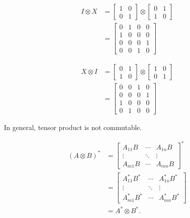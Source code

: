 \begin{align*}
	I \otimes X &= \begin{bmatrix}
		1 & 0 \\
		0 & 1
	\end{bmatrix}
	\otimes
	\begin{bmatrix}
		0 & 1 \\
		1 & 0
	\end{bmatrix}\\
	&=
	\begin{bmatrix}
	0 & 1 & 0 & 0 \\
	1 & 0 & 0 & 0 \\
	0 & 0 & 0 & 1 \\
	0 & 0 & 1 & 0
	\end{bmatrix}
\end{align*}

\begin{align*}
	X \otimes I &= \begin{bmatrix}
		0 & 1 \\
		1 & 0
	\end{bmatrix}
	\otimes
	\begin{bmatrix}
		1 & 0 \\
		0 & 1
	\end{bmatrix}\\
	&= \begin{bmatrix}
	0 & 0 & 1 & 0 \\
	0 & 0 & 0 & 1 \\
	1 & 0 & 0 & 0 \\
	0 & 1 & 0 & 0
	\end{bmatrix}
\end{align*}

In general, tensor product is not commutable.



\begin{align*}
	(A \otimes B)^*
	&=
	\begin{bmatrix}
		A_{11} B & \cdots & A_{1n} B \\
		\vdots & \ddots  & \vdots \\
		A_{m1}B & \cdots & A_{mn} B
	\end{bmatrix}^* \\
	&=
	\begin{bmatrix}
		A_{11}^* B^* & \cdots & A_{1n}^* B^* \\
		\vdots & \ddots  & \vdots \\
		A_{m1}^* B^* & \cdots & A_{mn}^* B^*
	\end{bmatrix} \\
	&= A^* \otimes B^*.
\end{align*}


